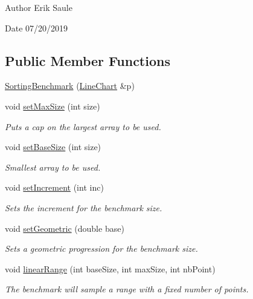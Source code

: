 \begin{DoxyAuthor}{Author}
Erik Saule 
\end{DoxyAuthor}
\begin{DoxyDate}{Date}
07/20/2019 
\end{DoxyDate}
\subsection*{Public Member Functions}
\begin{DoxyCompactItemize}
\item 
\hyperlink{classbridges_1_1benchmark_1_1_sorting_benchmark_aed5731a3b5add3a7f4c80891b22b3093}{Sorting\+Benchmark} (\hyperlink{classbridges_1_1datastructure_1_1_line_chart}{Line\+Chart} \&p)
\item 
void \hyperlink{classbridges_1_1benchmark_1_1_sorting_benchmark_abdca289b823c7f240b648e248c07b059}{set\+Max\+Size} (int size)
\begin{DoxyCompactList}\small\item\em Puts a cap on the largest array to be used. \end{DoxyCompactList}\item 
void \hyperlink{classbridges_1_1benchmark_1_1_sorting_benchmark_afe0474d148c185ed1e479ff11f42ae51}{set\+Base\+Size} (int size)
\begin{DoxyCompactList}\small\item\em Smallest array to be used. \end{DoxyCompactList}\item 
void \hyperlink{classbridges_1_1benchmark_1_1_sorting_benchmark_ae168533dc5756f3ede3436bdd7840047}{set\+Increment} (int inc)
\begin{DoxyCompactList}\small\item\em Sets the increment for the benchmark size. \end{DoxyCompactList}\item 
void \hyperlink{classbridges_1_1benchmark_1_1_sorting_benchmark_ade76a5749b07d35b02623cce27c046ab}{set\+Geometric} (double base)
\begin{DoxyCompactList}\small\item\em Sets a geometric progression for the benchmark size. \end{DoxyCompactList}\item 
void \hyperlink{classbridges_1_1benchmark_1_1_sorting_benchmark_a993de51c8b82ec50eb186afef5dc7003}{linear\+Range} (int base\+Size, int max\+Size, int nb\+Point)
\begin{DoxyCompactList}\small\item\em The benchmark will sample a range with a fixed number of points. \end{DoxyCompactList}\item 

\end{DoxyCompactItemize}
